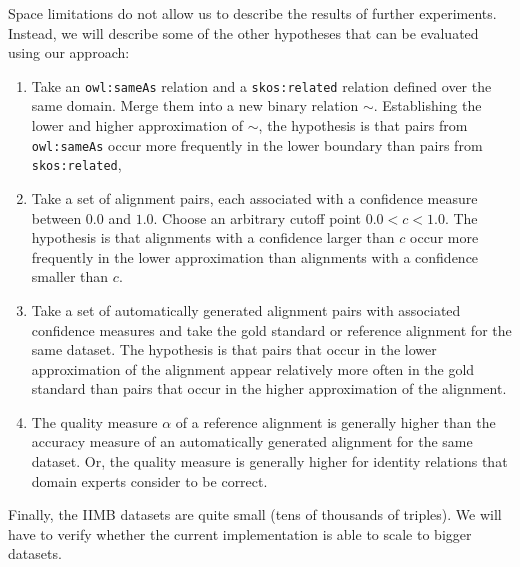 Space limitations do not allow us to describe the results of further
  experiments. Instead, we will describe some of the other hypotheses
  that can be evaluated using our approach:
\begin{enumerate}
\item Take an {\small \texttt{owl:sameAs}} relation and
        a {\small \texttt{skos:related}}
        relation defined over the same domain.
      Merge them into a new binary relation $\sim$.
      Establishing the lower and higher approximation of $\sim$,
        the hypothesis is that pairs from {\small \texttt{owl:sameAs}}
        occur more frequently in the lower boundary than pairs from
        {\small \texttt{skos:related}},
\item Take a set of alignment pairs, each associated with a confidence measure
        between $0.0$ and $1.0$.
      Choose an arbitrary cutoff point $0.0 < c < 1.0$.
      The hypothesis is that alignments with a confidence larger than $c$
        occur more frequently in the lower approximation than alignments
        with a confidence smaller than $c$.
\item Take a set of automatically generated alignment pairs with
        associated confidence measures and take the gold standard or
        reference alignment for the same dataset.
      The hypothesis is that pairs that occur in the lower approximation
        of the alignment appear relatively more often in the gold standard
        than pairs that occur in the higher approximation of the alignment.
\item The quality measure $\alpha$ of a reference alignment is generally
        higher than the accuracy measure of an automatically generated
        alignment for the same dataset.
      Or, the quality measure is generally higher for identity relations
        that domain experts consider to be correct.
\end{enumerate}

\noindent Finally, the IIMB datasets are quite small
  (tens of thousands of triples).
We will have to verify whether the current implementation is able to scale
  to bigger datasets.
